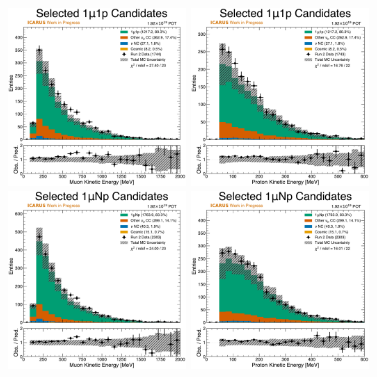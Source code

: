 \begin{figure}
    \centering
    \includegraphics[width=0.42\textwidth]{figures/data_mc_comparisons/datamc_hist1d_1mu1p_muon_ke.pdf}
    \includegraphics[width=0.42\textwidth]{figures/data_mc_comparisons/datamc_hist1d_1mu1p_proton_ke.pdf}
    \\
    \includegraphics[width=0.42\textwidth]{figures/data_mc_comparisons/datamc_hist1d_1muNp_muon_ke.pdf}
    \includegraphics[width=0.42\textwidth]{figures/data_mc_comparisons/datamc_hist1d_1muNp_proton_ke.pdf}

\end{figure}
